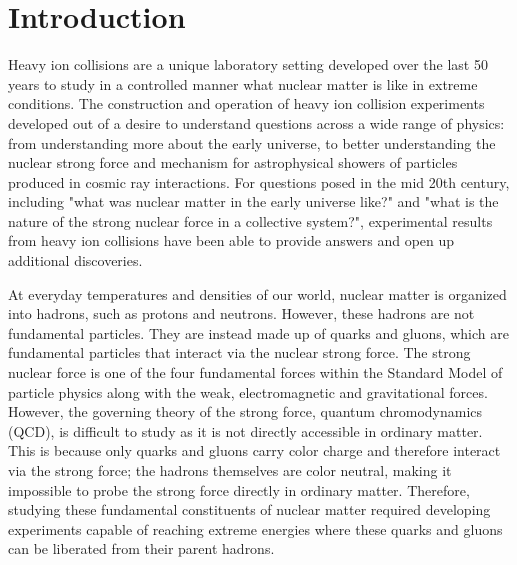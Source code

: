 \chapter{Introduction}
\label{ch:intro}

Heavy ion collisions are a unique laboratory setting developed over the last 50 years to study in a controlled manner what nuclear matter is like in extreme conditions. 
The construction and operation of heavy ion collision experiments developed out of a desire to understand questions across a wide range of physics: from understanding more about the early universe, to better understanding the nuclear strong force and mechanism for astrophysical showers of particles produced in cosmic ray interactions. 
For questions posed in the mid 20th century, including "what was nuclear matter in the early universe like?" and "what is the nature of the strong nuclear force in a collective system?", experimental results from heavy ion collisions have been able to provide answers and open up additional discoveries. 

At everyday temperatures and densities of our world, nuclear matter is organized into hadrons, such as protons and neutrons. 
However, these hadrons are not fundamental particles. They are instead made up of quarks and gluons, which are fundamental particles that interact via the nuclear strong force. 
The strong nuclear force is one of the four fundamental forces within the Standard Model of particle physics along with the weak, electromagnetic and gravitational forces.
However, the governing theory of the strong force, quantum chromodynamics (QCD), is difficult to study as it is not directly accessible in ordinary matter.
This is because only quarks and gluons carry color charge and therefore interact via the strong force; the hadrons themselves are color neutral, making it impossible to probe the strong force directly in ordinary matter. 
Therefore, studying these fundamental constituents of nuclear matter required developing experiments capable of reaching extreme energies where these quarks and gluons can be liberated from their parent hadrons.

